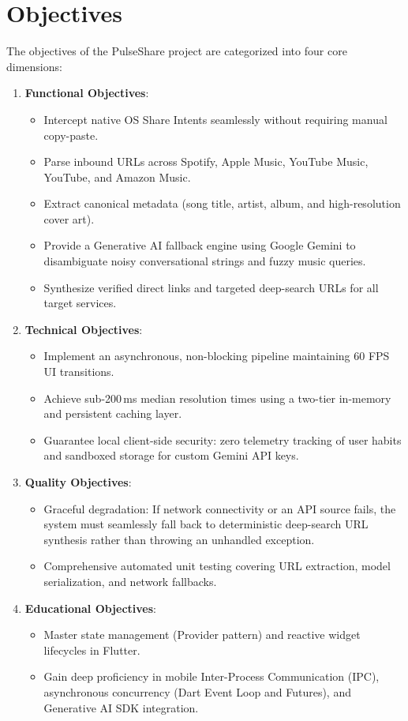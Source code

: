 \documentclass[12pt,a4paper]{report}
\begin{document}
\section{Objectives}
The objectives of the PulseShare project are categorized into four core dimensions:
\begin{enumerate}
    \item \textbf{Functional Objectives}:
    \begin{itemize}
        \item Intercept native OS Share Intents seamlessly without requiring manual copy-paste.
        \item Parse inbound URLs across Spotify, Apple Music, YouTube Music, YouTube, and Amazon Music.
        \item Extract canonical metadata (song title, artist, album, and high-resolution cover art).
        \item Provide a Generative AI fallback engine using Google Gemini to disambiguate noisy conversational strings and fuzzy music queries.
        \item Synthesize verified direct links and targeted deep-search URLs for all target services.
    \end{itemize}
    \item \textbf{Technical Objectives}:
    \begin{itemize}
        \item Implement an asynchronous, non-blocking pipeline maintaining 60 FPS UI transitions.
        \item Achieve sub-200\,ms median resolution times using a two-tier in-memory and persistent caching layer.
        \item Guarantee local client-side security: zero telemetry tracking of user habits and sandboxed storage for custom Gemini API keys.
    \end{itemize}
    \item \textbf{Quality Objectives}:
    \begin{itemize}
        \item Graceful degradation: If network connectivity or an API source fails, the system must seamlessly fall back to deterministic deep-search URL synthesis rather than throwing an unhandled exception.
        \item Comprehensive automated unit testing covering URL extraction, model serialization, and network fallbacks.
    \end{itemize}
    \item \textbf{Educational Objectives}:
    \begin{itemize}
        \item Master state management (Provider pattern) and reactive widget lifecycles in Flutter.
        \item Gain deep proficiency in mobile Inter-Process Communication (IPC), asynchronous concurrency (Dart Event Loop and Futures), and Generative AI SDK integration.
    \end{itemize}
\end{enumerate}
\end{document}
